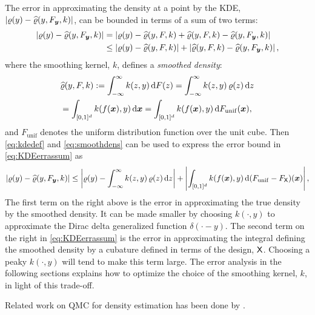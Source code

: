 \documentclass[letterpaper]{amsart}
\newcommand{\hvarrho}{\widehat{\varrho}}
\begin{document}
The error in approximating the density at a point by the KDE, $\abs{\varrho(y) - \hvarrho(y,F_{\vy},k)}$, can be bounded in terms of a sum of two terms:
\begin{align}
	\label{eq:KDEerrassum}
	\abs{\varrho(y) - \hvarrho(y,F_{\vy},k)} & =
	\abs{\varrho(y) - \hvarrho(y,F,k) + \hvarrho(y,F,k) - \hvarrho(y,F_{\vy},k)} \\
	\nonumber
	& \le  \abs{\varrho(y) - \hvarrho(y,F,k)} + \abs{\hvarrho(y,F,k) - \hvarrho(y,F_{\vy},k)},
\end{align}
where the smoothing kernel, $k$, defines a \emph{smoothed density}:
\begin{multline}
	\label{eq:smoothdens}
\hvarrho(y,F,k) := \int_{-\infty}^{\infty} k(z,y) \, \dif F(z)
= \int_{-\infty}^{\infty} k(z,y) \, \varrho(z) \, \dif z \\
= \int_{[0,1]^d} k(f(\vx),y) \,  \dif \vx
 = \int_{[0,1]^d} k(f(\vx),y) \,  \dif F_{\mathrm{unif}}(\vx),
\end{multline}
and $F_{\mathrm{unif}}$ denotes the uniform distribution function over the unit cube.  Then \eqref{eq:kdedef} and \eqref{eq:smoothdens} can be used to express the error bound in \eqref{eq:KDEerrassum} as
\begin{equation}
	\label{eq:KDEerrassumA}
	\abs{\varrho(y) - \hvarrho(y,F_{\vy},k)} \le \abs{\varrho(y) - \int_{-\infty}^{\infty} k(z,y) \, \varrho(z) \, \dif z } + \abs{\int_{[0,1]^d} k(f(\vx),y) \,  \dif (F_{\mathrm{unif}} - F_{\mX})(\vx)},
\end{equation}
The first term on the right above is the error in approximating the true density by the smoothed density.  It can be made smaller by choosing $k(\cdot,y)$ to approximate the Dirac delta generalized function $\delta(\cdot - y)$.  The second term on the right in  \eqref{eq:KDEerrassum} is the error in approximating the integral defining the smoothed density by a cubature defined in terms of the design, $\mathsf{X}$.  Choosing a peaky $k(\cdot,y)$  will tend to make this term large.  The error analysis in the following sections explains how to optimize the choice of the smoothing kernel, $k$, in light of this trade-off.

Related work on QMC for density estimation has been done by \cite{AbdEtal21a,GilKuoSlo23a,LEcPuc20a,LEcuyer2022b}.
\end{document}
